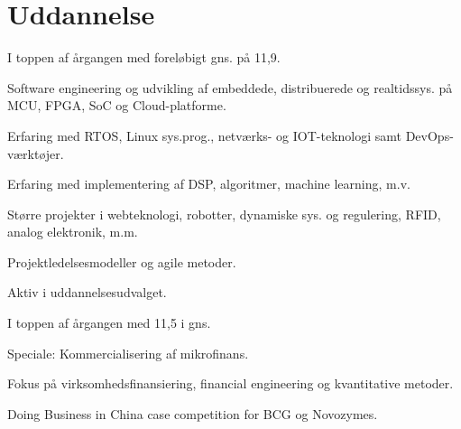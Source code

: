 \documentclass[a4paper]{janus-resume} %
\begin{document}
\begin{minipage}[t]{0.49\textwidth} %


\section{Uddannelse} 

I toppen af årgangen med foreløbigt gns. på 11,9.
\vspace{\topsep}
\begin{tightitemize}
\item Software engineering og udvikling af embeddede, distribuerede og realtidssys. på MCU, FPGA, SoC og Cloud-platforme. \\
\item Erfaring med RTOS, Linux sys.prog., netværks- og IOT-teknologi samt DevOps-værktøjer. \\
\item Erfaring med implementering af DSP, algoritmer, machine learning, m.v. \\
\item Større projekter i webteknologi, robotter, dynamiske sys. og regulering, RFID, analog elektronik, m.m. \\
\item Projektledelsesmodeller og agile metoder.
\item Aktiv i uddannelsesudvalget.
\end{tightitemize}

\sectionspace %

I toppen af årgangen med 11,5 i gns.
\begin{tightitemize}
\item Speciale: Kommercialisering af mikrofinans. \\
\item Fokus på virksomhedsfinansiering, financial engineering og kvantitative metoder. \\
\item Doing Business in China case competition for BCG og Novozymes. \\
\end{tightitemize}


\end{minipage}
\end{document}
